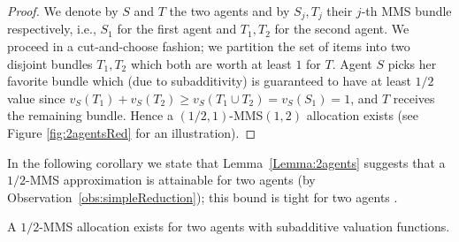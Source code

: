 \begin{proof}


    We denote by $S$ and $T$ the two agents and by $S_j, T_j$ their $j$-th MMS bundle respectively, i.e., $S_1$ for the first agent and $T_1, T_2$ for the second agent. 
    We proceed in a cut-and-choose fashion; we partition the set of items into two disjoint bundles $T_1, T_2$ which both are worth at least $1$ for $T$. Agent $S$ picks her favorite bundle which (due to subadditivity) is guaranteed to have at least $1/2$ value since $v_S(T_1) + v_S(T_2) \geq v_S(T_1 \cup T_2)=v_S(S_1)= 1$, and $T$ receives the remaining bundle. Hence a $(1/2,1)$-MMS$(1,2)$ allocation exists (see Figure \ref{fig:2agentsRed} for an illustration).
\end{proof}

In the following corollary we state that Lemma~\ref{Lemma:2agents} suggests that a $1/2$-MMS approximation is attainable for two agents (by Observation~\ref{obs:simpleReduction}); this bound is tight for two agents \cite{GhodsiHSSY22}. 

\begin{corollary}
\label{cor:2agents}
    A $1/2$-MMS allocation exists for two agents with subadditive valuation functions.
\end{corollary}

